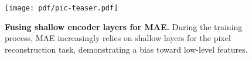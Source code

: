 \begin{figure}[t!]
\centering
\texttt{[image: pdf/pic-teaser.pdf]}
\vspace{-2em}
\caption{\textbf{Fusing shallow encoder layers for MAE.} During the training process, MAE increasingly relies on shallow layers for the pixel reconstruction task, demonstrating a bias toward low-level features.}
\label{fig:teaser}
\end{figure}
